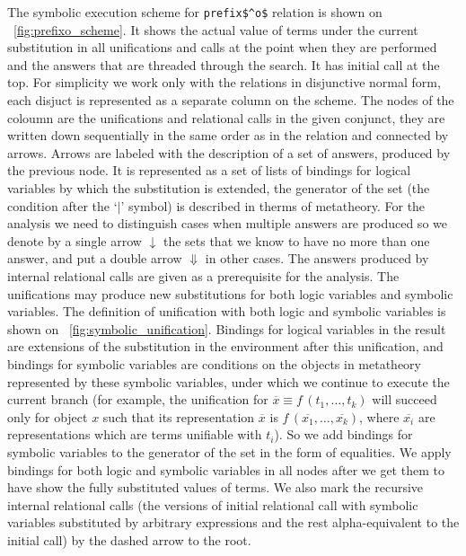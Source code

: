 The symbolic execution scheme for \lstinline|prefix$^o$| relation is shown on \figureword~\ref{fig:prefixo_scheme}. It shows the actual value of terms under the current
substitution in all unifications and calls at the point when they are performed and the answers that are threaded through the search. It has initial call at the top.
For simplicity we work only with the relations in disjunctive normal form, each disjuct is represented as a separate column on the scheme. The nodes of the coloumn are
the unifications and relational calls in the given conjunct, they are written down sequentially in the same order as in the relation and connected by arrows. Arrows are
labeled with the description of a set of answers, produced by the previous node. It is represented as a set of lists of bindings for logical variables by which the
substitution is extended, the generator of the set (the condition after the `$\mid$' symbol) is described in therms of metatheory. For the analysis we need to distinguish
cases when multiple answers are produced so we denote by a single arrow $\downarrow$ the sets that we know to have no more than one answer, and put a double arrow $\Downarrow$
in other cases. The answers produced by internal relational calls are given as a prerequisite for the analysis. The unifications may produce new substitutions for
both logic variables and symbolic variables. The definition of unification with both logic and symbolic variables is shown on \figureword~\ref{fig:symbolic_unification}.
Bindings for logical variables in the result are extensions of the substitution in the environment after this unification, and bindings for symbolic variables are conditions
on the objects in metatheory represented by these symbolic variables, under which we continue to execute the current branch (for example, the unification for $\overline{x} \equiv f\,(t_1, \dots, t_k)$ will succeed only for object $x$ such that its representation $\overline{x}$ is $f\,(\overline{x_1}, \dots, \overline{x_k})$, where $\overline{x_i}$ are representations which are terms
unifiable with $t_i$). So we add bindings for symbolic variables to the generator of the set in the form of equalities. We apply bindings for both logic and symbolic variables in
all nodes after we get them to have show the fully substituted values of terms. We also mark the recursive internal relational calls (the versions of initial relational call with
symbolic variables substituted by arbitrary expressions and the rest alpha-equivalent to the initial call) by the dashed arrow to the root.

